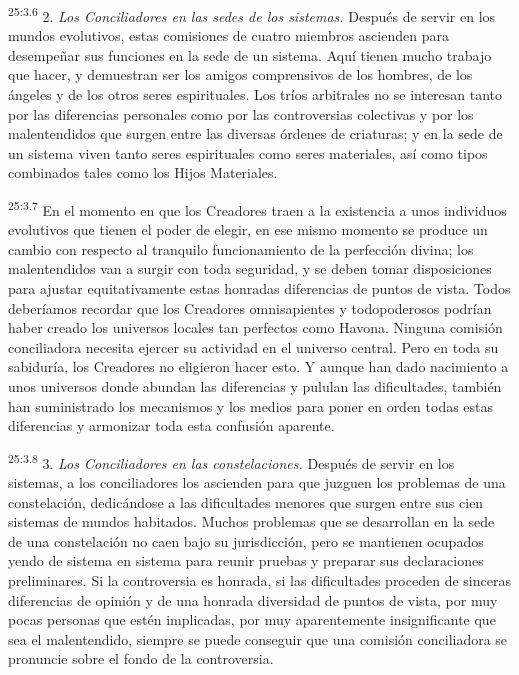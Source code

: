\par
\textsuperscript{25:3.6} 2. \textit{Los Conciliadores en las sedes de los sistemas.} Después de servir en los mundos evolutivos, estas comisiones de cuatro miembros ascienden para desempeñar sus funciones en la sede de un sistema. Aquí tienen mucho trabajo que hacer, y demuestran ser los amigos comprensivos de los hombres, de los ángeles y de los otros seres espirituales. Los tríos arbitrales no se interesan tanto por las diferencias personales como por las controversias colectivas y por los malentendidos que surgen entre las diversas órdenes de criaturas; y en la sede de un sistema viven tanto seres espirituales como seres materiales, así como tipos combinados tales como los Hijos Materiales.

\par
\textsuperscript{25:3.7} En el momento en que los Creadores traen a la existencia a unos individuos evolutivos que tienen el poder de elegir, en ese mismo momento se produce un cambio con respecto al tranquilo funcionamiento de la perfección divina; los malentendidos van a surgir con toda seguridad, y se deben tomar disposiciones para ajustar equitativamente estas honradas diferencias de puntos de vista. Todos deberíamos recordar que los Creadores omnisapientes y todopoderosos podrían haber creado los universos locales tan perfectos como Havona. Ninguna comisión conciliadora necesita ejercer su actividad en el universo central. Pero en toda su sabiduría, los Creadores no eligieron hacer esto. Y aunque han dado nacimiento a unos universos donde abundan las diferencias y pululan las dificultades, también han suministrado los mecanismos y los medios para poner en orden todas estas diferencias y armonizar toda esta confusión aparente.

\par
\textsuperscript{25:3.8} 3. \textit{Los Conciliadores en las constelaciones.} Después de servir en los sistemas, a los conciliadores los ascienden para que juzguen los problemas de una constelación, dedicándose a las dificultades menores que surgen entre sus cien sistemas de mundos habitados. Muchos problemas que se desarrollan en la sede de una constelación no caen bajo su jurisdicción, pero se mantienen ocupados yendo de sistema en sistema para reunir pruebas y preparar sus declaraciones preliminares. Si la controversia es honrada, si las dificultades proceden de sinceras diferencias de opinión y de una honrada diversidad de puntos de vista, por muy pocas personas que estén implicadas, por muy aparentemente insignificante que sea el malentendido, siempre se puede conseguir que una comisión conciliadora se pronuncie sobre el fondo de la controversia.

